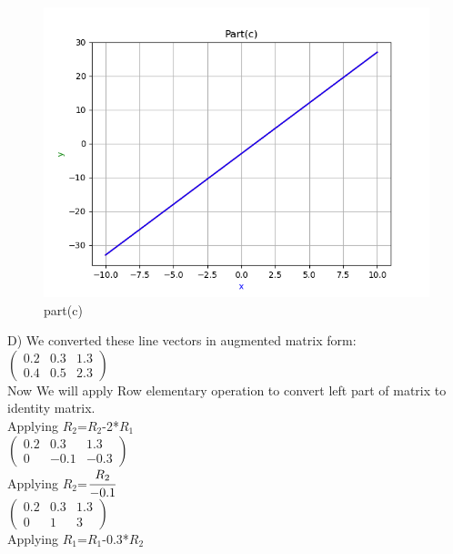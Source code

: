 \renewcommand{\thefigure}{\theenumi.\arabic{figure}}
\begin{figure}[!ht]
    \centering
    \includegraphics[width=\columnwidth]{./figures/A1_partc}
\caption{part(c)}
\label{fig: part(c)}
\end{figure}
D)
We converted these line vectors in augmented matrix form:\\ 

$\begin{pmatrix}
0.2 & 0.3 & 1.3\\
0.4 & 0.5 & 2.3
\end{pmatrix}$\\
 

Now We will apply Row elementary operation to convert left part of matrix to identity matrix.\\

Applying $R_{2}$=$R_{2}$-2*$R_{1}$\\

$\begin{pmatrix}
0.2 & 0.3 & 1.3\\
0 & -0.1 & -0.3
\end{pmatrix}$\\

Applying $R_{2}$=$\cfrac{R_{2}}{-0.1}$\\

$\begin{pmatrix}
0.2 & 0.3 & 1.3\\
0 & 1 & 3
\end{pmatrix}$\\

Applying $R_{1}$=$R_{1}$-0.3*$R_{2}$\\

